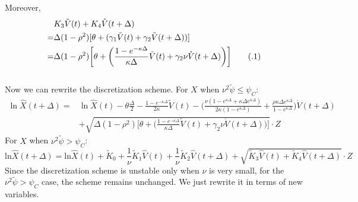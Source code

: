 \documentclass{ws-ijfe}
\newcommand\numberthis{\addtocounter{equation}{1}\tag{\theequation}}
\begin{document}
Moreover,
\begin{align*}
&K_3\hat{V}(t)+K_4\hat{V}(t+\Delta)\\
=&\Delta(1-\rho^2)[\theta+(\gamma_1\tilde{V}(t)+\gamma_2\tilde{V}(t+\Delta))]\\
=&\Delta(1-\rho^2)\bigg[\theta+\bigg(\frac{1-e^{-\kappa\Delta}}{\kappa\Delta}\tilde{V}(t)+\gamma_2\nu \mathring{V}(t+\Delta)\bigg)\bigg]\numberthis\label{QEK3K4}
\end{align*}
\\
Now we can rewrite the discretization scheme.
For $X$ when $\nu^2\tilde{\psi} \leq \psi_C $:
\begin{equation}\label{newLnX}
\begin{split}
  \ln\hat{X}(t+\Delta)=&\ln\hat{X}(t)-\theta\frac{\Delta}{2}-\frac{1-e^{-\kappa\Delta}}{2\kappa}\tilde{V}(t)-\bigg(\frac{\nu(1-e^{\kappa\Delta}+\kappa\Delta e^{\kappa\Delta})}{2\kappa(1-e^{\kappa\Delta})}+\frac{\rho\kappa\Delta e^{\kappa\Delta}}{1-e^{\kappa\Delta}}\bigg)\mathring{V}(t+\Delta)\\
  &+\sqrt{\Delta(1-\rho^2)\bigg[\theta+\bigg(\frac{1-e^{-\kappa\Delta}}{\kappa\Delta}\tilde{V}(t)+\gamma_2\nu \mathring{V}(t+\Delta)\bigg)\bigg]}\cdot Z
\end{split}
\end{equation}
For $X$ when $\nu^2\tilde{\psi} > \psi_C $:
\begin{equation}\label{newLnX2}
  \text{ln}\hat{X}(t+\Delta)=\text{ln}\hat{X}(t)+\tilde{K}_0+\frac{1}{\nu}\tilde{K}_1\hat{V}(t)+\frac{1}{\nu}\tilde{K}_2\hat{V}(t+\Delta)+\sqrt{\tilde{K}_3\hat{V}(t)+\tilde{K}_4\hat{V}(t+\Delta)}\cdot Z
\end{equation}
Since the discretization scheme is unstable only when $\nu$ is very small, for the $\nu^2\tilde{\psi} > \psi_C $ case, the scheme remains unchanged. We just rewrite it in terms of new variables.
\end{document}
